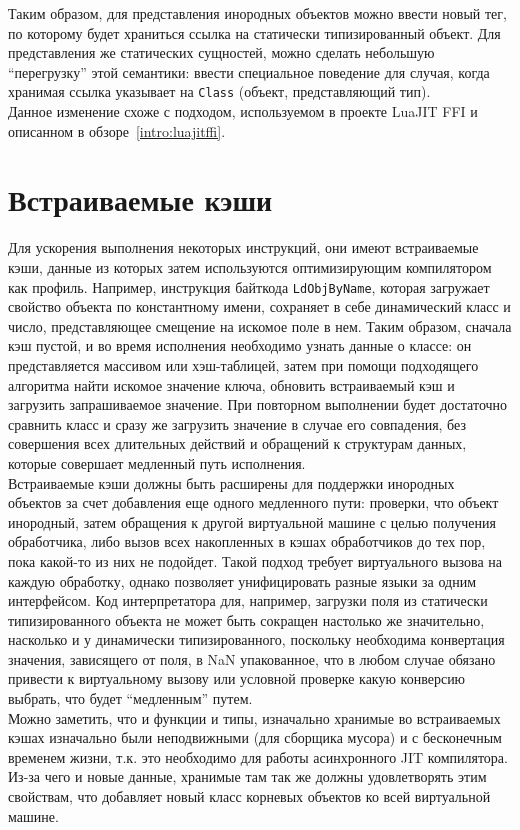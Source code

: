 \documentclass[times,specification,annotation]{itmo-student-thesis}
\begin{document}
Таким образом, для представления инородных объектов можно ввести новый тег, по которому будет храниться ссылка на статически типизированный объект. Для представления же статических сущностей, можно сделать небольшую ``перегрузку'' этой семантики: ввести специальное поведение для случая, когда хранимая ссылка указывает на \texttt{Class} (объект, представляющий тип).\\
Данное изменение схоже с подходом, используемом в проекте LuaJIT FFI и описанном в обзоре~\ref{intro:luajitffi}.

\section{Встраиваемые кэши}
Для ускорения выполнения некоторых инструкций, они имеют встраиваемые кэши, данные из которых затем используются оптимизирующим компилятором как профиль. Например, инструкция байткода \texttt{LdObjByName}, которая загружает свойство объекта по константному имени, сохраняет в себе динамический класс и число, представляющее смещение на искомое поле в нем. Таким образом, сначала кэш пустой, и во время исполнения необходимо узнать данные о классе: он представляется массивом или хэш-таблицей, затем при помощи подходящего алгоритма найти искомое значение ключа, обновить встраиваемый кэш и загрузить запрашиваемое значение. При повторном выполнении будет достаточно сравнить класс и сразу же загрузить значение в случае его совпадения, без совершения всех длительных действий и обращений к структурам данных, которые совершает медленный путь исполнения.\\
Встраиваемые кэши должны быть расширены для поддержки инородных объектов за счет добавления еще одного медленного пути: проверки, что объект инородный, затем обращения к другой виртуальной машине с целью получения обработчика, либо вызов всех накопленных в кэшах обработчиков до тех пор, пока какой-то из них не подойдет. Такой подход требует виртуального вызова на каждую обработку, однако позволяет унифицировать разные языки за одним интерфейсом. Код интерпретатора для, например, загрузки поля из статически типизированного объекта не может быть сокращен настолько же значительно, насколько и у динамически типизированного, поскольку необходима конвертация значения, зависящего от поля, в NaN упакованное, что в любом случае обязано привести к виртуальному вызову или условной проверке какую конверсию выбрать, что будет ``медленным'' путем.\\
Можно заметить, что и функции и типы, изначально хранимые во встраиваемых кэшах изначально были неподвижными (для сборщика мусора) и с бесконечным временем жизни, т.к. это необходимо для работы асинхронного JIT компилятора. Из-за чего и новые данные, хранимые там так же должны удовлетворять этим свойствам, что добавляет новый класс корневых объектов ко всей виртуальной машине.
\end{document}
